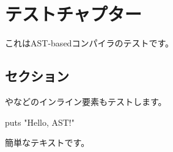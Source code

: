 \chapter{テストチャプター}
\label{chap:test_chapter}
これはAST{-}basedコンパイラのテストです。
\section{セクション}
\label{sec:1-1}
やなどのインライン要素もテストします。
\begin{reviewlistblock}
\begin{reviewlist}
puts "Hello, AST!"
\end{reviewlist}
\end{reviewlistblock}
簡単なテキストです。
